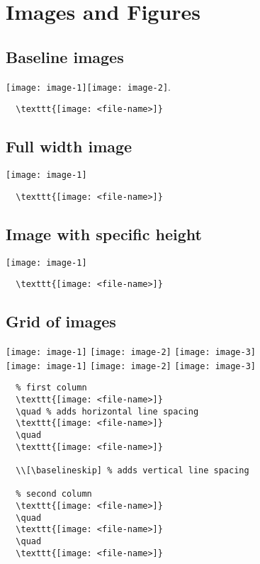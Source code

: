 \section{Images and Figures}

\subsection{Baseline images}

\lipsum[1][1-3]\texttt{[image: image-1]}\lipsum[1][1-3]\texttt{[image: image-2]}.

\begin{lstlisting}
  \texttt{[image: <file-name>]}
\end{lstlisting}

\clearpage
\subsection{Full width image}

\texttt{[image: image-1]}

\begin{lstlisting}
  \texttt{[image: <file-name>]}
\end{lstlisting}

\clearpage
\subsection{Image with specific height}

\texttt{[image: image-1]}

\begin{lstlisting}
  \texttt{[image: <file-name>]}
\end{lstlisting}

\clearpage
\subsection{Grid of images}

\texttt{[image: image-1]}
\quad
\texttt{[image: image-2]}
\quad
\texttt{[image: image-3]}
\\[\baselineskip]%
\texttt{[image: image-1]}
\quad
\texttt{[image: image-2]}
\quad
\texttt{[image: image-3]}

\begin{lstlisting}
  % first column
  \texttt{[image: <file-name>]}
  \quad % adds horizontal line spacing
  \texttt{[image: <file-name>]}
  \quad
  \texttt{[image: <file-name>]}

  \\[\baselineskip] % adds vertical line spacing

  % second column
  \texttt{[image: <file-name>]}
  \quad
  \texttt{[image: <file-name>]}
  \quad
  \texttt{[image: <file-name>]}
\end{lstlisting}

